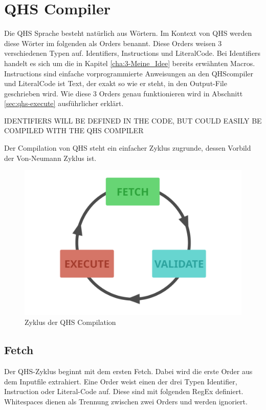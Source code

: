 \chapter{QHS Compiler} \label{cha:4-QHS_Compiler}
Die QHS Sprache besteht natürlich aus Wörtern. Im Kontext von QHS werden diese Wörter im folgenden als Orders benannt. Diese Orders weisen 3 verschiedenen Typen auf. Identifiers, Instructions und LiteralCode.
Bei Identifiers handelt es sich um die in Kapitel \ref{cha:3-Meine_Idee} bereits erwähnten Macros. Instructions sind einfache vorprogrammierte Anweisungen an den QHScompiler und LiteralCode ist Text, der exakt so wie er steht,
in den Output-File geschrieben wird. Wie diese 3 Orders genau funktionieren wird in Abschnitt \ref{sec:qhs-execute} ausführlicher erklärt.

IDENTIFIERS WILL BE DEFINED IN THE CODE, BUT COULD EASILY BE COMPILED WITH THE QHS COMPILER

Der Compilation von QHS steht ein einfacher Zyklus zugrunde, dessen Vorbild der Von-Neumann Zyklus ist.

\begin{figure}[h!]
    \centering
    \includegraphics[scale=0.6]{resources/qhs-cycle.png}
    \caption{Zyklus der QHS Compilation}
    \label{fig:qhs-cycle}
\end{figure}

\section{Fetch} \label{sec:qhs-fetch}
Der QHS-Zyklus beginnt mit dem ersten Fetch. Dabei wird die erste Order aus dem Inputfile extrahiert. Eine Order weist einen der drei Typen Identifier, Instruction oder Literal-Code auf. Diese sind mit folgenden RegEx definiert.
Whitespaces dienen als Trennung zwischen zwei Orders und werden ignoriert.

